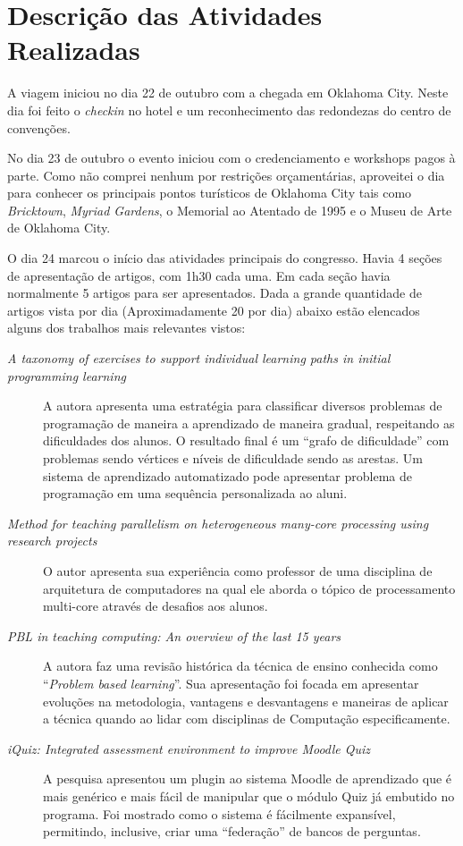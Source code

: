 \documentclass{article}
\begin{document}
\section{Descrição das Atividades Realizadas}
A viagem iniciou no dia 22 de outubro com a chegada em Oklahoma City. Neste dia foi feito o \emph{checkin} no hotel e um reconhecimento das redondezas do centro de convenções.

No dia 23 de outubro o evento iniciou com o credenciamento e workshops pagos à parte. Como não comprei nenhum por restrições orçamentárias, aproveitei o dia para conhecer os principais pontos turísticos de Oklahoma City tais como \emph{Bricktown}, \emph{Myriad Gardens}, o Memorial ao Atentado de 1995 e o Museu de Arte de Oklahoma City.

O dia 24 marcou o início das atividades principais do congresso. Havia 4 seções de apresentação de artigos, com 1h30 cada uma. Em cada seção havia normalmente 5 artigos para ser apresentados. Dada a grande quantidade de artigos vista por dia (Aproximadamente 20 por dia) abaixo estão elencados alguns dos trabalhos mais relevantes vistos:

\begin{description}
	\item[\emph{A taxonomy of exercises to support individual learning paths in initial programming learning}] A autora apresenta uma estratégia para classificar diversos problemas de programação de maneira a aprendizado de maneira gradual, respeitando as dificuldades dos alunos. O resultado final é um ``grafo de dificuldade'' com problemas sendo vértices e níveis de dificuldade sendo as arestas. Um sistema de aprendizado automatizado pode apresentar problema de programação em uma sequência personalizada ao aluni.
	\item[\emph{Method for teaching parallelism on heterogeneous many-core processing using research projects}] O autor apresenta sua experiência como professor de uma disciplina de arquitetura de computadores na qual ele aborda o tópico de processamento multi-core através de desafios aos alunos. 
	\item[\emph{PBL in teaching computing: An overview of the last 15 years}] A autora faz uma revisão histórica da técnica de ensino conhecida como ``\emph{Problem based learning}''. Sua apresentação foi focada em apresentar evoluções na metodologia, vantagens e desvantagens e maneiras de aplicar a técnica quando ao lidar com disciplinas de Computação especificamente.
	\item[\emph{iQuiz: Integrated assessment environment to improve Moodle Quiz}] A pesquisa apresentou um plugin ao sistema Moodle de aprendizado que é mais genérico e mais fácil de manipular que o módulo Quiz já embutido no programa. Foi mostrado como o sistema é fácilmente expansível, permitindo, inclusive, criar uma ``federação'' de bancos de perguntas.
\end{description}
\end{document}
